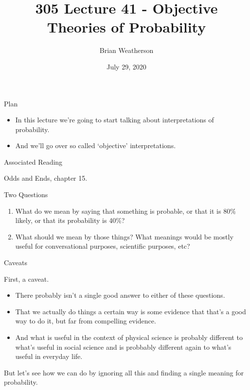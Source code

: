 \documentclass[
  ignorenonframetext,
]{beamer}
\title{305 Lecture 41 - Objective Theories of Probability}
\author{Brian Weatherson}
\date{July 29, 2020}
\providecommand{\tightlist}{%
  \setlength{\itemsep}{0pt}\setlength{\parskip}{0pt}}
\renewcommand{\,}{\text{, }}
\begin{document}
\frame{\titlepage}

\begin{frame}{Plan}
\protect\hypertarget{plan}{}

\begin{itemize}
\tightlist
\item
  In this lecture we're going to start talking about interpretations of
  probability.
\item
  And we'll go over so called `objective' interpretations.
\end{itemize}

\end{frame}

\begin{frame}{Associated Reading}
\protect\hypertarget{associated-reading}{}

Odds and Ends, chapter 15.

\end{frame}

\begin{frame}{Two Questions}
\protect\hypertarget{two-questions}{}

\begin{enumerate}
\tightlist
\item
  What do we mean by saying that something is probable, or that it is
  80\% likely, or that its probability is 40\%? \pause
\item
  What should we mean by those things? What meanings would be mostly
  useful for conversational purposes, scientific purposes, etc?
\end{enumerate}

\end{frame}

\begin{frame}{Caveats}
\protect\hypertarget{caveats}{}

First, a caveat.

\begin{itemize}
\tightlist
\item
  There probably isn't a single good answer to either of these
  questions.
\item
  That we actually do things a certain way is some evidence that that's
  a good way to do it, but far from compelling evidence.
\item
  And what is useful in the context of physical science is probably
  different to what's useful in social science and is probbably
  different again to what's useful in everyday life. \pause
\end{itemize}

But let's see how we can do by ignoring all this and finding a single
meaning for probability.

\end{frame}
\end{document}
